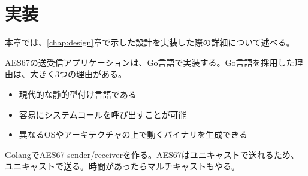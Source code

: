 \chapter{実装}
\label{chap:implementation}

本章では、\ref{chap:design}章で示した設計を実装した際の詳細について述べる。

AES67の送受信アプリケーションは、Go言語で実装する。Go言語を採用した理由は、大きく3つの理由がある。

\begin{itemize}
  \item 現代的な静的型付け言語である
  \item 容易にシステムコールを呼び出すことが可能
  \item 異なるOSやアーキテクチャの上で動くバイナリを生成できる
\end{itemize}

GolangでAES67 sender/receiverを作る。AES67はユニキャストで送れるため、ユニキャストで送る。時間があったらマルチキャストもやる。
